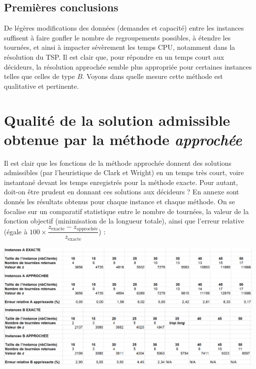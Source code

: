 \documentclass[french, 11pt, a4paper]{article} %
\newcommand{\smb}{\smallbreak}
\begin{document}
\subsection{Premières conclusions}
De légères modifications des données (demandes et capacité) entre les instances suffisent à faire gonfler
le nombre de regroupements possibles, à étendre les tournées,
et ainsi à impacter sévèrement les temps CPU, notamment dans la résolution du TSP.
\smb Il est clair que, pour répondre en un temps court aux décideurs, la résolution approchée semble plus
appropriée pour certaines instances telles que celles de type $B$. Voyons dans quelle mesure
cette méthode est qualitative et pertinente.

\section{Qualité de la solution admissible obtenue par la méthode \emph{approchée}}

Il est clair que les fonctions de la méthode approchée donnent des solutions admissibles (par l'heuristique de Clark et Wright)
en un temps très court, voire instantané devant les temps enregistrés pour la méthode exacte.
Pour autant, doit-on être prudent en donnant ces solutions aux décideurs ?
\smb En annexe sont donnés les résultats obtenus pour chaque instance et chaque méthode.
On se focalise sur un comparatif statistique entre le nombre de tournées, la valeur de la fonction objectif
(minimisation de la longueur totale), 
ainsi que l'erreur relative 
(égale à $100 \times \dfrac{z_{\text{exacte}} - z_{\text{approchée}}}{z_{\text{exacte}}}$) :

\begin{center}
    \includegraphics[scale=0.50]{AnalyseInstA.PNG}
    \\
    \vspace{+0.5cm}
    \includegraphics[scale=0.50]{AnalyseInstB.PNG}
\end{center}
\end{document}
